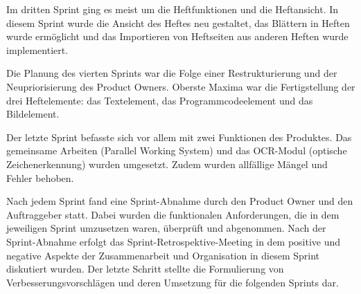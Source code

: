 
Im dritten Sprint ging es meist um die Heftfunktionen und die Heftansicht. In diesem Sprint wurde die Ansicht des Heftes neu gestaltet, das Blättern in Heften wurde ermöglicht und das Importieren von Heftseiten aus anderen Heften wurde implementiert.


Die Planung des vierten Sprints war die Folge einer Restrukturierung und der Neupriorisierung des Product Owners. Oberste Maxima war die Fertigstellung der drei Heftelemente: das Textelement, das Programmcodeelement und das Bildelement.


Der letzte Sprint befasste sich vor allem mit zwei Funktionen des Produktes. Das gemeinsame Arbeiten (Parallel Working System) und das OCR-Modul (optische Zeichenerkennung) wurden umgesetzt. Zudem wurden allfällige Mängel und Fehler behoben.


Nach jedem Sprint fand eine Sprint-Abnahme durch den Product Owner und den Auftraggeber statt. Dabei wurden die funktionalen Anforderungen, die in dem jeweiligen Sprint umzusetzen waren, überprüft und abgenommen. Nach der Sprint-Abnahme erfolgt das Sprint-Retrospektive-Meeting in dem positive und negative Aspekte der Zusammenarbeit und Organisation in diesem Sprint diskutiert wurden. Der letzte Schritt stellte die Formulierung von Verbesserungsvorschlägen und deren Umsetzung für die folgenden Sprints dar.


